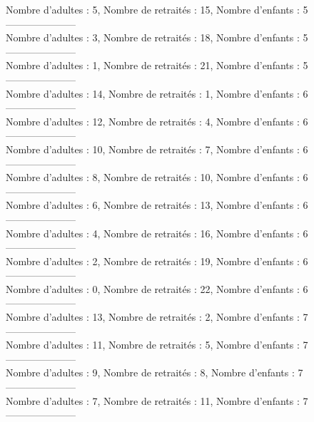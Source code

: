 \documentclass[10pt,a4paper]{article}
\begin{document}
Nombre d'adultes : 5, Nombre de retraités : 15, Nombre d'enfants : 5\\
---------------------\\
Nombre d'adultes : 3, Nombre de retraités : 18, Nombre d'enfants : 5\\
---------------------\\
Nombre d'adultes : 1, Nombre de retraités : 21, Nombre d'enfants : 5\\
---------------------\\
Nombre d'adultes : 14, Nombre de retraités : 1, Nombre d'enfants : 6\\
---------------------\\
Nombre d'adultes : 12, Nombre de retraités : 4, Nombre d'enfants : 6\\
---------------------\\
Nombre d'adultes : 10, Nombre de retraités : 7, Nombre d'enfants : 6\\
---------------------\\
Nombre d'adultes : 8, Nombre de retraités : 10, Nombre d'enfants : 6\\
---------------------\\
Nombre d'adultes : 6, Nombre de retraités : 13, Nombre d'enfants : 6\\
---------------------\\
Nombre d'adultes : 4, Nombre de retraités : 16, Nombre d'enfants : 6\\
---------------------\\
Nombre d'adultes : 2, Nombre de retraités : 19, Nombre d'enfants : 6\\
---------------------\\
Nombre d'adultes : 0, Nombre de retraités : 22, Nombre d'enfants : 6\\
---------------------\\
Nombre d'adultes : 13, Nombre de retraités : 2, Nombre d'enfants : 7\\
---------------------\\
Nombre d'adultes : 11, Nombre de retraités : 5, Nombre d'enfants : 7\\
---------------------\\
Nombre d'adultes : 9, Nombre de retraités : 8, Nombre d'enfants : 7\\
---------------------\\
Nombre d'adultes : 7, Nombre de retraités : 11, Nombre d'enfants : 7\\
---------------------\\
\end{document}
